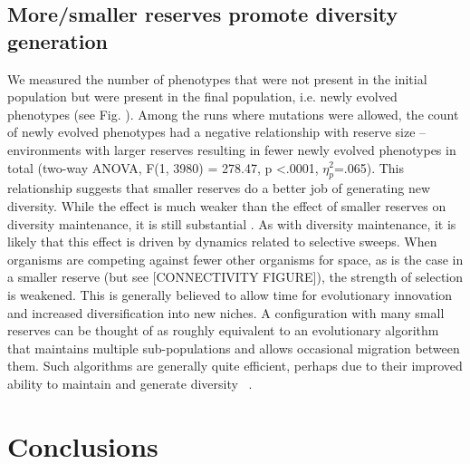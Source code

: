 \documentclass[letterpaper]{article}
\begin{document}
\subsection{More/smaller reserves promote diversity generation}
        
		We measured the number of phenotypes that were not present in the initial population but were present in the final population, i.e. newly evolved phenotypes (see Fig. \label{fig:diversitygenerationmaintenance}). Among the runs where mutations were allowed, the count of newly evolved phenotypes had a negative relationship with reserve size – environments with larger reserves resulting in fewer newly evolved phenotypes in total (two-way ANOVA, F(1, 3980) = 278.47, p \textless .0001, $\eta_{p}^{2}$=.065). This relationship suggests that smaller reserves do a better job of generating new diversity. While the effect is much weaker than the effect of smaller reserves on diversity maintenance, it is still substantial \citep{lakens_calculating_2013}. As with diversity maintenance, it is likely that this effect is driven by dynamics related to selective sweeps. When organisms are competing against fewer other organisms for space, as is the case in a smaller reserve (but see [CONNECTIVITY FIGURE]), the strength of selection is weakened. This is generally believed to allow time for evolutionary innovation and increased diversification into new niches. A configuration with many small reserves can be thought of as roughly equivalent to an evolutionary algorithm that maintains multiple sub-populations and allows occasional migration between them. Such algorithms are generally quite efficient, perhaps due to their improved ability to maintain and generate diversity ~\citep{tomassini_spatially_2005}. 
%
%
%
%
%
%

\section{Conclusions}
\end{document}
